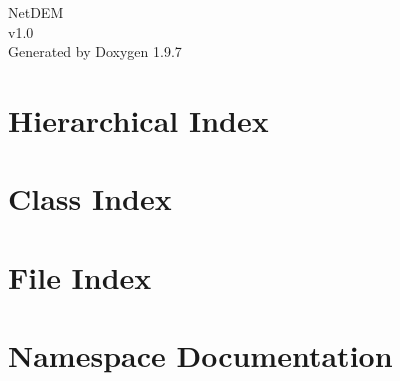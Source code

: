 \documentclass[twoside]{book}
\newcommand{\+}{\discretionary{\mbox{\scriptsize$\hookleftarrow$}}{}{}}
\newcommand{\clearemptydoublepage}{%
    \newpage{\pagestyle{empty}\cleardoublepage}%
  }
\begin{document}
  \raggedbottom
    \hypersetup{pageanchor=false,
                bookmarksnumbered=true,
                pdfencoding=unicode
               }
  \begin{titlepage}
  \vspace*{7cm}
  \begin{center}%
  {\Large Net\+DEM}\\
  [1ex]\large v1.\+0 \\
  \vspace*{1cm}
  {\large Generated by Doxygen 1.9.7}\\
  \end{center}
  \end{titlepage}
  \clearemptydoublepage
  \tableofcontents
  \clearemptydoublepage
  \hypersetup{pageanchor=true}

\chapter{Hierarchical Index}

\chapter{Class Index}

\chapter{File Index}

\chapter{Namespace Documentation}

\end{document}
